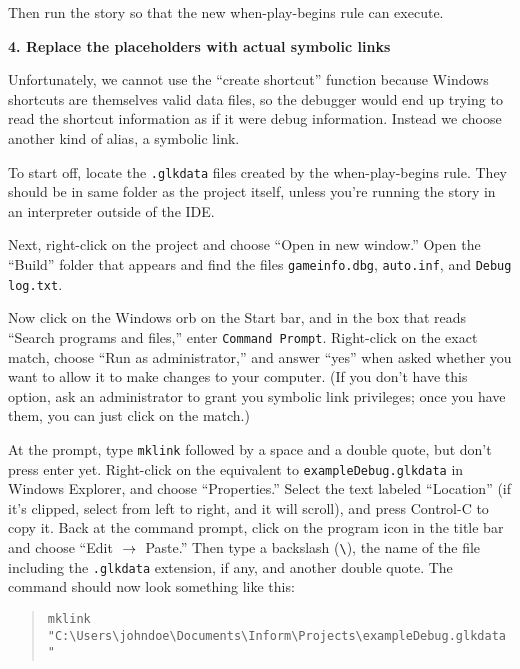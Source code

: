 \documentclass{book}
\newcommand{\nil}{{\null}}
\newcommand{\thento}{\(\nil\rightarrow\nil\)}
\begin{document}
\begin{quote}
  
\end{quote}

Then run the story so that the new when-play-begins rule can execute.

\textbf{4. Replace the placeholders with actual symbolic links}

Unfortunately, we cannot use the ``create shortcut'' function because Windows
shortcuts are themselves valid data files, so the debugger would end up trying
to read the shortcut information as if it were debug information.  Instead we
choose another kind of alias, a symbolic link.

To start off, locate the \texttt{.glkdata} files created by the when-play-begins
rule.  They should be in same folder as the project itself, unless you're
running the story in an interpreter outside of the IDE.

Next, right-click on the project and choose ``Open in new window.''  Open the
``Build'' folder that appears and find the files \texttt{gameinfo.dbg},
\texttt{auto.inf}, and \texttt{Debug log.txt}.

Now click on the Windows orb on the Start bar, and in the box that reads
``Search programs and files,'' enter \texttt{Command Prompt}.  Right-click on
the exact match, choose ``Run as administrator,'' and answer ``yes'' when asked
whether you want to allow it to make changes to your computer.  (If you don't
have this option, ask an administrator to grant you symbolic link privileges;
once you have them, you can just click on the match.)

At the prompt, type \texttt{mklink} followed by a space and a double quote, but
don't press enter yet.  Right-click on the equivalent to
\texttt{exampleDebug.glkdata} in Windows Explorer, and choose ``Properties.''
Select the text labeled ``Location'' (if it's clipped, select from left to
right, and it will scroll), and press Control-C to copy it.  Back at the command
prompt, click on the program icon in the title bar and choose ``Edit \thento
Paste.''  Then type a backslash (\lstinline @\@), the name of the file including
the \texttt{.glkdata} extension, if any, and another double quote.  The command
should now look something like this:

\begin{quote}
  \lstinline{mklink "C:\Users\johndoe\Documents\Inform\Projects\exampleDebug.glkdata"}
\end{quote}
\end{document}
